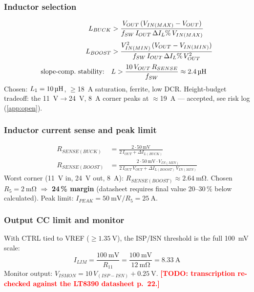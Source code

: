 \documentclass[11pt,a4paper]{article}
\newcommand{\todo}[1]{\textcolor{red}{\textbf{[TODO: #1]}}}
\begin{document}
\subsubsection{Inductor selection}
\begin{align}
  L_{BUCK}  &> \frac{V_{OUT}\,(V_{IN(MAX)} - V_{OUT})}{f_{SW}\,I_{OUT}\,\Delta I_L\% \, V_{IN(MAX)}} \\[2pt]
  L_{BOOST} &> \frac{V_{IN(MIN)}^2\,(V_{OUT} - V_{IN(MIN)})}{f_{SW}\,I_{OUT}\,\Delta I_L\% \, V_{OUT}^2} \\[2pt]
  \text{slope-comp.\ stability:}\quad & L > \frac{10\,V_{OUT}\,R_{SENSE}}{f_{SW}} \approx \SI{2.4}{\uH}
\end{align}
Chosen: $L_1 = \SI{10}{\uH}$, $\ge$\SI{18}{\A} saturation, ferrite, low DCR.
Height-budget tradeoff: the \SI{11}{\V}$\rightarrow$\SI{24}{\V}, \SI{8}{\A} corner
peaks at $\approx$\SI{19}{\A} --- accepted, see risk log (\autoref{app:open}).

\subsubsection{Inductor current sense and peak limit}
\begin{align}
  R_{SENSE(BUCK)}  &= \frac{2 \cdot \SI{50}{\mV}}{2\,I_{OUT} + \Delta I_{L(BUCK)}} \\[2pt]
  R_{SENSE(BOOST)} &= \frac{2 \cdot \SI{50}{\mV} \cdot V_{IN(MIN)}}
                           {2\,I_{OUT}\,V_{OUT} + \Delta I_{L(BOOST)}\,V_{IN(MIN)}}
\end{align}
Worst corner (\SI{11}{\V} in, \SI{24}{\V} out, \SI{8}{\A}):
$R_{SENSE(BOOST)} \approx \SI{2.64}{\m\ohm}$.
Chosen $R_5 = \SI{2}{\m\ohm}$ $\Rightarrow$ \textbf{24\,\% margin}
(datasheet requires final value 20--30\,\% below calculated).
Peak limit: $I_{PEAK} = \SI{50}{\mV}/R_5 = \SI{25}{\A}$.

\subsubsection{Output CC limit and monitor}
With CTRL tied to VREF ($\ge \SI{1.35}{\V}$), the ISP/ISN threshold is the full
\SI{100}{\mV} scale:
\begin{equation}
  I_{LIM} = \frac{\SI{100}{\mV}}{R_{11}}
          = \frac{\SI{100}{\mV}}{\SI{12}{\m\ohm}} = \SI{8.33}{\A}
\end{equation}
Monitor output: $V_{ISMON} = 10\,V_{(ISP-ISN)} + \SI{0.25}{\V}$.
\todo{transcription re-checked against the LT8390 datasheet p.~22.}
\end{document}
